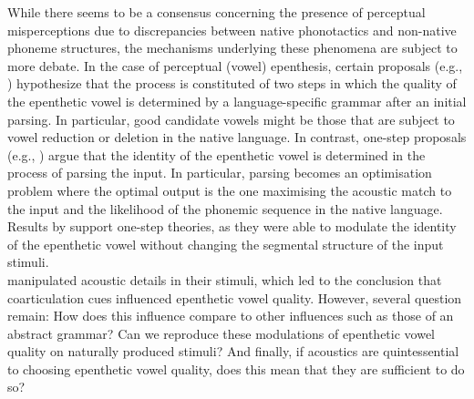 



While there seems to be a consensus concerning the presence of perceptual misperceptions due to discrepancies between native phonotactics and non-native phoneme structures, the mechanisms underlying these phenomena are subject to more debate. In the case of perceptual (vowel) epenthesis, certain proposals (e.g., \cite{berent2007, monahan2009}) hypothesize that the process is constituted of two steps in which the quality of the epenthetic vowel is determined by a language-specific grammar after an initial parsing. In particular, good candidate vowels might be those that are subject to vowel reduction or deletion in the native language.  
In contrast, one-step proposals (e.g., \cite{dupoux2011}) argue that the identity of the epenthetic vowel is determined in the process of parsing the input. In particular, parsing becomes an optimisation problem where the optimal output is the one maximising the acoustic match to the input and the likelihood of the phonemic sequence in the native language. Results by \cite{dupoux2011} support one-step theories, as they were able to modulate the identity of the epenthetic vowel without changing the segmental structure of the input stimuli. \\

\cite{dupoux2011} manipulated acoustic details in their stimuli, which led to the conclusion that coarticulation cues influenced epenthetic vowel quality. However, several question remain: How does this influence compare to other influences such as those of an abstract grammar? Can we reproduce these modulations of epenthetic vowel quality on naturally produced stimuli? And finally, if acoustics are quintessential to choosing epenthetic vowel quality, does this mean that they are sufficient to do so? \\

